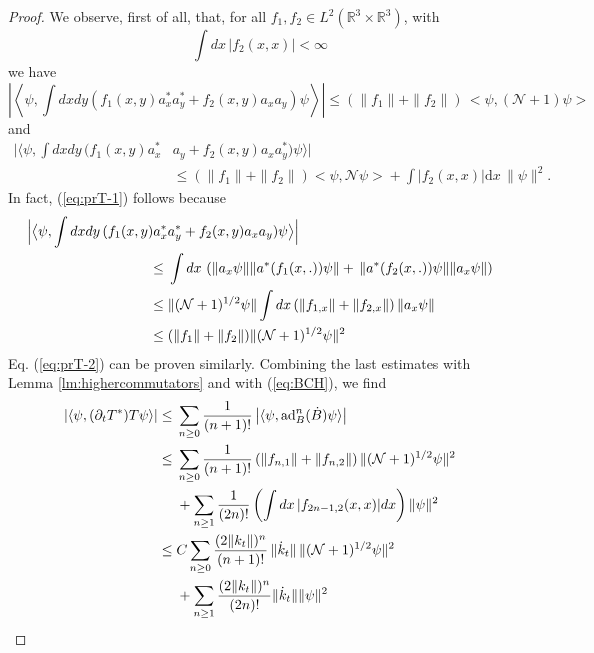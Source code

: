 \documentclass[11pt,a4paper]{article}
\newcommand{\bR}{{\mathbb R}}
\newcommand{\cN}{{\cal N}}
\newcommand{\di}{\textrm{d}}		%
\newcommand{\Ncal}{\mathcal{N}}		%
\newcommand{\scal}[2]{\big<#1,#2\big>} %
\begin{document}
\begin{proof}
We observe, first of all, that, for all $f_1, f_2 \in L^2 (\bR^3 \times\bR^3)$, with 
\[ \int dx \, |f_2 (x,x)| < \infty \]
we have
\begin{equation}\label{eq:prT-1}  \left| \left\langle \psi, \int dx dy \left( f_1(x,y) a^\ast_x a^\ast_y + f_2(x,y) a_x a_y \right) \psi \right\rangle \right|  \leq (\| f_1 \| + \| f_2 \|) \, \scal{\psi}{(\Ncal+1)\psi} 
\end{equation}
and
\begin{equation}\label{eq:prT-2} \begin{split} \Big|  \big\langle \psi , \int dx dy \, ( f_1(x,y) a^\ast_x
& a_y + f_2(x,y) a_x a^\ast_y ) \psi \big\rangle \Big|  \\ & \leq (\| f_1 \| + \| f_2 \|) \scal{\psi}{\Ncal\psi} + \int |f_2(x,x)| \di x  \, \| \psi \|^2 .
\end{split} \end{equation}
In fact, (\ref{eq:prT-1}) follows because
\[ \begin{split} 
 \Big| \big\langle \psi, \int dx dy \, ( f_1(x,y) a^\ast_x &a^\ast_y + f_2(x,y) a_x a_y) \psi \big\rangle \Big| \\
 \leq \; & \int dx \, \left( \| a_x \psi \| \| a^* (f_1(x,.)) \psi \| +  \, \| a^* (f_2 (x,.)) \psi \| \| a_x \psi \| \right) \\
 \leq \; & \| (\cN +1)^{1/2} \psi \|  \int dx \, (\| f_{1,x} \| + \| f_{2,x}\|) \,  \| a_x \psi \| \\
 \leq \; & (\| f_1 \| + \| f_2 \|) \| (\cN+1)^{1/2} \psi \|^2
 \end{split} \]
 Eq. (\ref{eq:prT-2}) can be proven similarly. Combining the last estimates with Lemma \ref{lm:highercommutators} and with (\ref{eq:BCH}), we find
 \[ \begin{split} 
| \langle \psi , (\partial_t T^*)T \psi \rangle|  \leq \; &\sum_{n \geq 0} \frac{1}{(n+1)!} \left| \langle \psi , \text{ad}^n_B (\dot{B}) \psi \rangle \right| \\
\leq \; &\sum_{n \geq 0} \frac{1}{(n+1)!} \left( \| f_{n,1} \| + \| f_{n,2} \| \right)  \| (\cN+1)^{1/2} \psi \|^2 \\& + \sum_{n\geq 1} \frac{1}{(2n)!}  \left(\int dx \, |f_{2n-1,2} (x,x)| dx \right)  \| \psi \|^2 \\
\leq \; &C \sum_{n\geq 0} \frac{(2 \| k_t \|)^n}{(n+1)!} \, \| \dot{k}_t \| \, \| (\cN+1)^{1/2} \psi \|^2 \\ &+ 
\sum_{n\geq 1} \frac{(2\| k_t \|)^n}{(2n)!}  \| \dot k_t \| \| \psi \|^2 \\ 

\end{split}\]
\end{proof}
\end{document}
